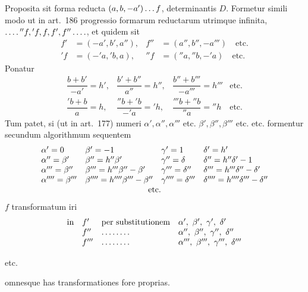 Proposita sit forma reducta $(a,b,-a')\mathinner{\ldotp\ldotp\ldotp} f$, determinantis $D$. Formetur simili modo ut in art.~186 progressio formarum reductarum utrimque infinita, $\mathinner{\ldotp\ldotp\ldotp\ldotp} {}''f,{}'f,f,f',f''\mathinner{\ldotp\ldotp\ldotp\ldotp}$, et quidem sit
\[
\begin{aligned}
f'&=(-a',b',a''),& f''&=(a'',b'',-a''')\quad\text{etc.}\\
{}'f&=(-{}'a,{}'b,a),& {}''f&=({}''a,{}''b,-{}'a)\quad\text{etc.}
\end{aligned}
\]
Ponatur
\[
\begin{array}{llll}
\dfrac{b+b'}{-a'}=h',&\dfrac{b'+b''}{a''}=h'',&\dfrac{b''+b'''}{-a'''}=h'''&\text{etc.}\\[6pt]
\dfrac{{}'b+b}{a}=h,&\dfrac{{}''b+{}'b}{-{}'a}={}'h,&\dfrac{{}'''b+{}''b}{{}''a}={}''h&\text{etc.}
\end{array}
\]
Tum patet, si (ut in art.~177) numeri $\alpha',\alpha'',\alpha'''$ etc. $\beta',\beta'',\beta'''$ etc. etc. formentur secundum algorithmum sequentem
{\small
\setlength{\arraycolsep}{3pt}
\[
\begin{array}{llll}
\alpha'=0&\beta'=-1&\gamma'=1&\delta'=h'\\
\alpha''=\beta'&\beta''=h''\beta'&\gamma''=\delta&\delta''=h''\delta'-1\\
\alpha'''=\beta''&\beta'''=h'''\beta''-\beta'&\gamma'''=\delta''&\delta'''=h'''\delta''-\delta'\\
\alpha''''=\beta'''&\beta''''=h''''\beta'''-\beta''&\gamma''''=\delta'''&\delta''''=h''''\delta'''-\delta''
\\
\multicolumn{4}{c}{\text{etc.}}
\end{array}
\]
}
$f$ transformatum iri
\[
\begin{array}{@{}rlll@{}}
\text{in}&f'&\text{per substitutionem}&\alpha',\ \beta',\ \gamma',\ \delta'\\
&f''&\mathinner{\ldotp\ldotp\ldotp\ldotp\ldotp\ldotp\ldotp\ldotp}&\alpha'',\ \beta'',\ \gamma'',\ \delta''\\
&f'''&\mathinner{\ldotp\ldotp\ldotp\ldotp\ldotp\ldotp\ldotp\ldotp}&\alpha''',\ \beta''',\ \gamma''',\ \delta'''
\end{array}
\]
\centerline{etc.}
omnesque has transformationes fore proprias.

